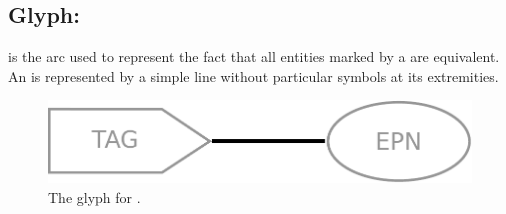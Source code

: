 \subsection{Glyph:  }\label{sec:equivalenceArc}

 is the arc used to represent the fact that all entities
marked by a  are equivalent. An  is represented by a simple line without particular symbols at its extremities.

\begin{figure}[H]
  \centering
  \includegraphics[scale = 0.4]{images/equivalence}
  \caption{The \PD glyph for .}
  \label{fig:equivalence}
\end{figure}
